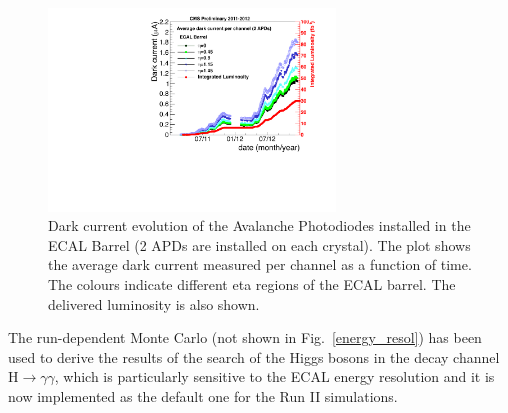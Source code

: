 \documentclass[journal]{IEEEtran}
\begin{document}
%
\begin{figure}[!t]
  \begin{center}
    \includegraphics[width=3.0in]{HV_avg_history}
    \caption{Dark current evolution of the Avalanche Photodiodes installed in the ECAL Barrel (2 APDs are installed on each crystal). The plot shows the average dark current measured per channel as a function of time. The colours indicate different eta regions of the ECAL barrel. The delivered luminosity is also shown. \label{fig:idark}}
  \end{center}
\end{figure}
%
The run-dependent Monte Carlo (not shown in Fig.~\ref{energy_resol}) has been used to derive the results of the search of the Higgs bosons in the decay channel H$\to\gamma\gamma$, which is particularly sensitive to the ECAL energy resolution and it is now implemented as the default one for the Run II simulations. 
\end{document}
